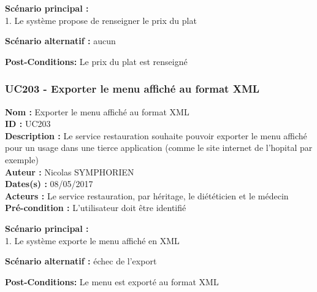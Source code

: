 \textbf{Scénario principal :}\\
1. Le système propose de renseigner le prix du plat

\textbf{Scénario alternatif :} aucun

\textbf{Post-Conditions:} Le prix du plat est renseigné

\subsubsection{UC203 - Exporter le menu affiché au format
XML}\label{uc203---exporter-le-menu-affichuxe9-au-format-xml}

\noindent\textbf{Nom :} Exporter le menu affiché au format XML\\
\textbf{ID :} UC203\\
\textbf{Description :} Le service restauration souhaite pouvoir exporter
le menu affiché pour un usage dans une tierce application (comme le site
internet de l'hopital par exemple)\\
\textbf{Auteur :} Nicolas SYMPHORIEN\\
\textbf{Dates(s) :} 08/05/2017\\
\textbf{Acteurs :} Le service restauration, par héritage, le diététicien
et le médecin\\
\textbf{Pré-condition :} L'utilisateur doit être identifié

\textbf{Scénario principal :}\\
1. Le système exporte le menu affiché en XML

\textbf{Scénario alternatif :} échec de l'export

\textbf{Post-Conditions:} Le menu est exporté au format XML
